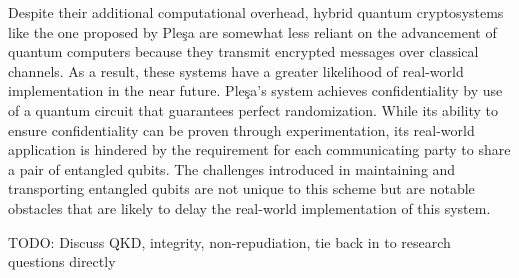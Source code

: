\documentclass[sigconf]{acmart}
\begin{document}
Despite their additional computational overhead, hybrid quantum cryptosystems like the one proposed by Pleşa are somewhat less reliant on the advancement of quantum computers because they transmit encrypted messages over classical channels. As a result, these systems have a greater likelihood of real-world implementation in the near future. Pleşa's system achieves confidentiality by use of a quantum circuit that guarantees perfect randomization\cite{plesa_hybrid_2017}. While its ability to ensure confidentiality can be proven through experimentation, its real-world application is hindered by the requirement for each communicating party to share a pair of entangled qubits. The challenges introduced in maintaining and transporting entangled qubits are not unique to this scheme but are notable obstacles that are likely to delay the real-world implementation of this system.

TODO: Discuss QKD, integrity, non-repudiation, tie back in to research questions directly

\end{document}

